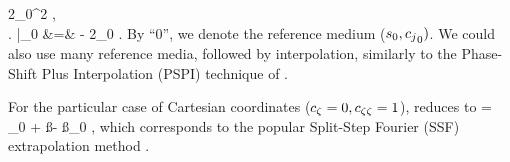       {2{\czz}_0^2  } \;,
\nonumber \\
\left . \frac{\partial\kz}{\partial\cz}\right |_{0} &=&
   -
      {2{\czz}_0    } \;.
\eeqa
By ``0'', we denote the reference medium ($s_0,{c_j}_0)$.
We could also use many reference media, followed by 
interpolation, similarly to the 
Phase-Shift Plus Interpolation (PSPI) technique of
\cite{GEO49.02.01240131}.
\par
For the particular case of Cartesian coordinates
($c_{\zeta }=0, c_{\zeta\zeta}=1$),
 reduces to
\beq 
\kz = {\kz}_0 + \ww \lp \ss - \ss_0 \rp \;,
\eeq
which corresponds to the popular Split-Step Fourier (SSF) 
extrapolation method \cite[]{GEO55-04-04100421}.



